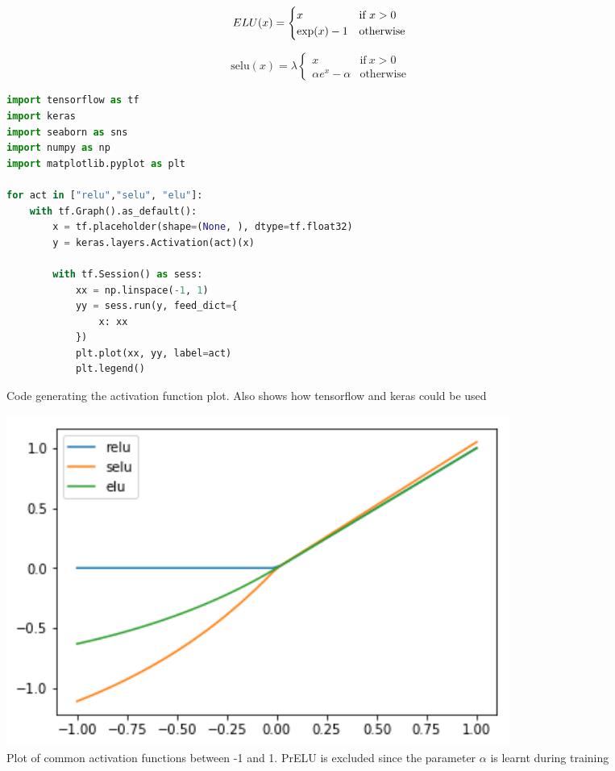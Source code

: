 \documentclass[times, utf8, diplomski, english]{fer}
\begin{document}
\begin{equation}
\label{eq:elu}
ELU(x)=
\begin{cases}
x & \text{if}\ x>0 \\
\exp(x) - 1 & \text{otherwise}
\end{cases}    \\
\end{equation}

\begin{equation}
\label{eq:selu}
\text{selu}(x)= \lambda
\begin{cases}
x & \text{if}\ x>0 \\
\alpha e^x - \alpha & \text{otherwise}
\end{cases} 
\end{equation}

\begin{figure}
\begin{lstlisting}[language=python,style=protobuf]
import tensorflow as tf
import keras
import seaborn as sns
import numpy as np
import matplotlib.pyplot as plt

for act in ["relu","selu", "elu"]:
    with tf.Graph().as_default():
        x = tf.placeholder(shape=(None, ), dtype=tf.float32)
        y = keras.layers.Activation(act)(x) 

        with tf.Session() as sess:
            xx = np.linspace(-1, 1)
            yy = sess.run(y, feed_dict={
                x: xx
            })
            plt.plot(xx, yy, label=act)
            plt.legend()
\end{lstlisting}
\label{fg:actcode}
\caption{Code generating the activation function plot. Also shows how tensorflow and keras could be used}
\end{figure}

\begin{figure}
    \begin{center}
        \includegraphics[width=0.8\textwidth]{act_plot}
        \caption{Plot of common activation functions between -1 and 1. PrELU is excluded since the parameter $\alpha$ is learnt during training}
        \label{fg:act_plot}
    \end{center}
\end{figure}
\end{document}
